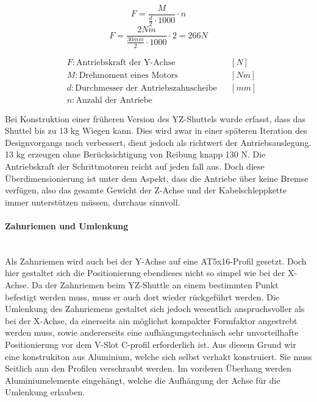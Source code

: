 \vspace{5mm}
\noindent\begin{minipage}{\textwidth}
\begin{minipage}[t]{0.5\textwidth}
    \begin{equation*}
        F = \frac{M}{\frac{d}{2} \cdot 1000} \cdot n
    \end{equation*}
    \begin{equation*}
        F = \frac{2 \unit{Nm}}{\frac{30 \unit{mm}}{2} \cdot 1000} \cdot 2 = 266 \unit{N}
    \end{equation*}
\end{minipage}%
\begin{minipage}[t]{0.4\textwidth}
    \vspace*{-5mm}
    \begin{align*}
        &F: \text{Antriebskraft der Y-Achse} & &\left[N\right]\\
        &M: \text{Drehmoment eines Motors} & &\left[Nm\right]\\
        &d: \text{Durchmesser der Antriebszahnscheibe} & &\left[mm\right]\\
        &n: \text{Anzahl der Antriebe} & &
    \end{align*}
\end{minipage}
\end{minipage}

\vspace{5mm}

Bei Konstruktion einer früheren Version des YZ-Shuttels wurde erfasst, dass das Shuttel bis zu 13 kg Wiegen kann. Dies wird zwar in einer späteren Iteration des Designvorgangs noch verbessert, dient jedoch als richtwert der Antriebsauslegung. 13 kg erzeugen ohne Berücksichtigung von Reibung knapp 130 N. Die Antriebskraft der Schrittmotoren reicht auf jeden fall aus. Doch diese Überdimensionierung ist unter dem Aspekt, dass die Antriebe über keine Bremse verfügen, also das gesamte Gewicht der Z-Achse und der Kabelschleppkette immer unterstützen müssen, durchaus sinnvoll.

\paragraph{Zahnriemen und Umlenkung}\mbox{}\\
Als Zahnriemen wird auch bei der Y-Achse auf eine AT5x16-Profil gesetzt. Doch hier gestaltet sich die Positionierung ebendieses nicht so simpel wie bei der X-Achse. Da der Zahnriemen beim YZ-Shuttle an einem bestimmten Punkt befestigt werden muss, muss er auch dort wieder rückgeführt werden. Die Umlenkung des Zahnriemens gestaltet sich jedoch wesentlich anspruchsvoller als bei der X-Achse, da einerseits ain möglichst kompakter Formfaktor angestrebt werden muss, sowie andererseits eine aufhängungstechnisch sehr unvorteilhafte Positionierung vor dem V-Slot C-profil erforderlich ist. Aus diesem Grund wir eine konstrukiton aus Aluminium, welche sich selbst verhakt konstruiert. Sie muss Seitlich ann den Profilen verschraubt werden. Im vorderen Überhang werden Aluminiumelemente eingehängt, welche die Aufhängung der Achse für die Umlenkung erlauben. 

